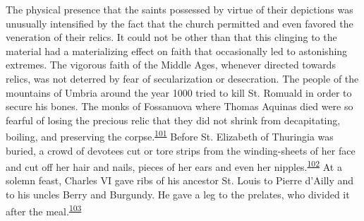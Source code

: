 The physical presence that the saints possessed by virtue of their
depictions was unusually intensified by the fact that the church
permitted and even favored the veneration of their relics. It could not
be other than that this clinging to the material had a materializing
effect on faith that occasionally led to astonishing extremes. The
vigorous faith of the Middle Ages, whenever directed towards relics, was
not deterred by fear of secularization or desecration. The people of the
mountains of Umbria around the year 1000 tried to kill St. Romuald in
order to secure his bones. The monks of Fossanuova where Thomas Aquinas
died were so fearful of losing the precious relic that they did not
shrink from decapitating, boiling, and preserving the
corpse.\textsuperscript{\protect\hypertarget{13_Chapter_Six__THE_DEPICTION_OF_TH.xhtmlux5cux23id_1070}{\protect\hyperlink{23_NOTES.xhtmlux5cux23id_1071}{101}}}
Before St. Elizabeth of Thuringia was buried, a crowd of devotees cut or
tore strips from the winding-sheets of her face and cut off her hair and
nails, pieces of her ears and even her
nipples.\textsuperscript{\protect\hypertarget{13_Chapter_Six__THE_DEPICTION_OF_TH.xhtmlux5cux23id_1068}{\protect\hyperlink{23_NOTES.xhtmlux5cux23id_1069}{102}}}
At a solemn feast, Charles VI gave ribs of his ancestor St. Louis to
Pierre d'Ailly and to his uncles Berry and Burgundy. He gave a leg to
the prelates, who divided it after the
meal.\textsuperscript{\protect\hypertarget{13_Chapter_Six__THE_DEPICTION_OF_TH.xhtmlux5cux23id_1066}{\protect\hyperlink{23_NOTES.xhtmlux5cux23id_1067}{103}}}

